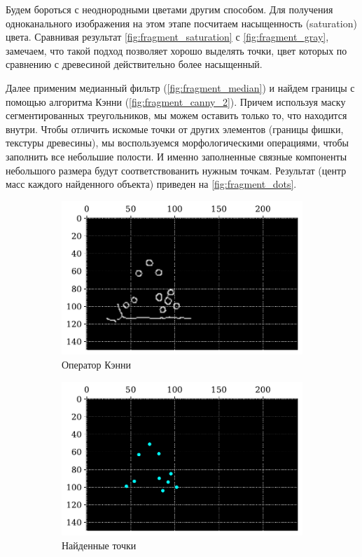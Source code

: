 \documentclass[12pt]{article}
\begin{document}
Будем бороться с неоднородными цветами другим способом. Для получения одноканального изображения на этом этапе посчитаем насыщенность (saturation) цвета. Сравнивая результат \autoref{fig:fragment_saturation} с \autoref{fig:fragment_gray}, замечаем, что такой подход позволяет хорошо выделять точки, цвет которых по сравнению с древесиной действительно более насыщенный.

Далее применим медианный фильтр (\autoref{fig:fragment_median}) и найдем границы с помощью алгоритма Кэнни (\autoref{fig:fragment_canny_2}). Причем используя маску сегментированных треугольников, мы можем оставить только то, что находится внутри. Чтобы отличить искомые точки от других элементов (границы фишки, текстуры древесины), мы воспользуемся морфологическими операциями, чтобы заполнить все небольшие полости. И именно заполненные связные компоненты небольшого размера будут соответствованить нужным точкам. Результат (центр масс каждого найденного объекта) приведен на \autoref{fig:fragment_dots}.

\begin{figure}[!h]
    \begin{subfigure}{.45\linewidth}
        \includegraphics[width=.93\linewidth]{fragment_canny_2.pdf}
        \centering
        \caption{Оператор Кэнни}
        \label{fig:fragment_canny_2}
    \end{subfigure}
    \begin{subfigure}{.45\linewidth}
        \includegraphics[width=.93\linewidth]{fragment_dots.pdf}
        \centering
        \caption{Найденные точки}
        \label{fig:fragment_dots}
    \end{subfigure}
    \centering
    \caption{}
\end{figure}
\end{document}
